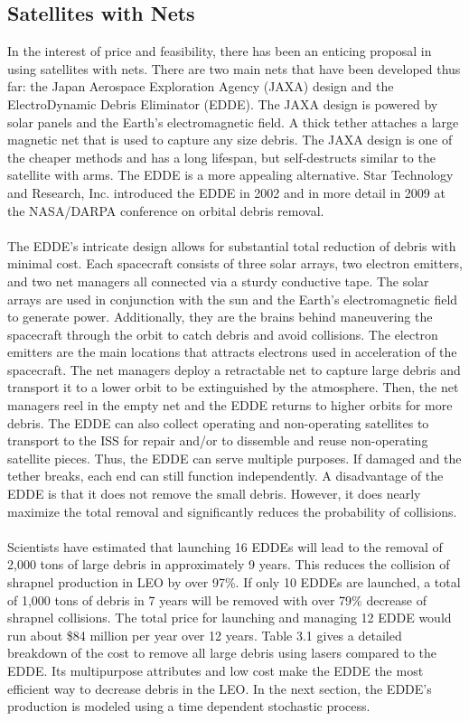 \documentclass{article}
\theoremstyle{plain}			%
\theoremstyle{definition}		%
\theoremstyle{remark}
\numberwithin{equation}{section}
\numberwithin{figure}{section}
\numberwithin{table}{section}
\begin{document}
\subsection{Satellites with Nets}
In the interest of price and feasibility, there has been an enticing proposal in using satellites with nets.  There are two main nets that have been developed thus far: the Japan Aerospace Exploration Agency (JAXA) design and the ElectroDynamic Debris Eliminator (EDDE). The JAXA design is powered by solar panels and the Earth's electromagnetic field. A thick tether attaches a large magnetic net that is used to capture any size debris. The JAXA design is one of the cheaper methods and has a long lifespan, but self-destructs similar to the satellite with arms. The EDDE is a more appealing alternative. Star Technology and Research, Inc. introduced the EDDE in 2002 and in more detail in 2009 at the NASA/DARPA conference on orbital debris removal.\\
\\
The EDDE's intricate design allows for substantial total reduction of debris with minimal cost.  Each spacecraft consists of three solar arrays, two electron emitters, and two net managers all connected via a sturdy conductive tape. The solar arrays are used in conjunction with the sun and the Earth's electromagnetic field to generate power. Additionally, they are the brains behind maneuvering the spacecraft through the orbit to catch debris and avoid collisions.  The electron emitters are the main locations that attracts electrons used in acceleration of the spacecraft.  The net managers deploy a retractable net to capture large debris and transport it to a lower orbit to be extinguished by the atmosphere. Then, the net managers reel in the empty net and the EDDE returns to higher orbits for more debris. The EDDE can also collect operating and non-operating satellites to transport to the ISS for repair and/or to dissemble and reuse non-operating satellite pieces. Thus, the EDDE can serve multiple purposes. If damaged and the tether breaks, each end can still function independently. A disadvantage of the EDDE is that it does not remove the small debris. However, it does nearly maximize the total removal and significantly reduces the probability of collisions.\\
\\
Scientists have estimated that launching 16 EDDEs will lead to the removal of 2,000 tons of large debris in approximately 9 years. This reduces the collision of shrapnel production in LEO by over 97\%.  If only 10 EDDEs are launched, a total of 1,000 tons of debris in 7 years will be removed with over 79\% decrease of shrapnel collisions.  The total price for launching and managing 12 EDDE would run about \$84 million per year over 12 years. Table 3.1 gives a detailed breakdown of the cost to remove all large debris using lasers compared to the EDDE. Its multipurpose attributes and low cost make the EDDE the most efficient way to decrease debris in the LEO. In the next section, the EDDE's production is modeled using a time dependent stochastic process.
\end{document}
